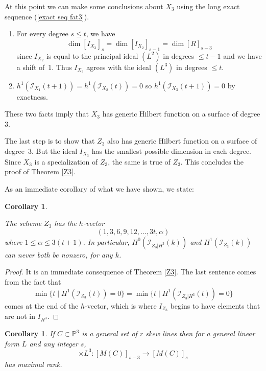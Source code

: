 \documentclass[12pt]{amsart}%
\numberwithin{equation}{section}
\newtheorem{corollary}[theorem]{Corollary}
\theoremstyle{definition}
\numberwithin{equation}{section}
\newcounter{step}
\renewcommand{\labelenumi}{\arabic{enumi}.  }
\begin{document}
At this point we can make some conclusions about  $X_3$ using the long exact sequence (\ref{exact seq fat3}).

\renewcommand{\theenumi}{\arabic{enumi}}
\renewcommand{\labelenumi}{\theenumi.}

\begin{enumerate}
    \item For every degree $s \leq t$, we have 
    \[
    \dim [I_{X_3}]_s = \dim [I_{X_2}]_{s-1} = \dim [R]_{s-3}
    \]
    since $I_{X_2}$ is equal to the principal ideal $(L^2)$ in degrees $\leq t-1$ and we have a shift of~1. Thus $I_{X_3}$ agrees with the ideal $(L^3)$ in degrees $\leq t$.

    \item $h^1(\mathcal I_{X_1}(t+1)) = h^1(\mathcal I_{X_2}(t)) = 0$ so $h^1(\mathcal I_{X_3}(t+1)) = 0$ by exactness.
\end{enumerate}

\noindent These two facts imply that $X_3$ has generic Hilbert function on a surface of degree 3.

The last step is to show that $Z_3$ also has generic Hilbert function on a surface of degree~3. But the ideal $I_{X_3}$ has the smallest possible dimension in each degree. Since $X_3$ is a specialization of $Z_3$, the same is true of  $Z_3$. This concludes the proof of Theorem \ref{Z3}.
\smallskip

As an immediate corollary of what we have shown, we state:

\begin{corollary} \label{cor: genHF3}
    
    The scheme $Z_3$ has the  $h$-vector 
    \[
    (1,3,6,9,12,\dots, 3t,\alpha)
    \]
    where $1 \leq \alpha \leq 3(t+1)$. In particular, $H^0(\mathcal I_{Z_3 |H^3}(k))$ and $H^1(\mathcal I_{Z_3}(k))$ can never both be nonzero, for any $k$.  
\end{corollary}

\begin{proof}

    It is an immediate consequence of Theorem \ref{Z3}.
    The last sentence comes from the fact that 
    \[
   \min \{ t \mid H^1(\mathcal I_{Z_3}(t)) = 0 \} =  \min \{ t \mid H^1(\mathcal I_{Z_3|H^3}(t)) = 0 \} 
\]
comes at the end of the $h$-vector, which is where $I_{Z_3}$ begins to have elements that are not in $I_{H^3}$.
\end{proof}

\begin{corollary} \label{SLP3}
    If $C \subset \mathbb P^3$ is a general set of $r$ skew lines then for a general linear form $L$ and any integer $s$,
    \[
    \times L^3 \colon [M(C)]_{s-3} \rightarrow  [M(C)]_s
    \]
     has maximal rank.
\end{corollary}
\end{document}
